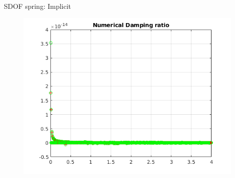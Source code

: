 \begin{frame}{SDOF spring: Implicit}
\begin{figure}[ht]
\begin{minipage}[b]{0.5\linewidth}
  \end{minipage}%
  \begin{minipage}[b]{0.5\linewidth}
    \centering
    \includegraphics[scale=.35]{images/sdof-imp-4.png} \\

  \end{minipage} 
\end{figure}
\end{frame}

